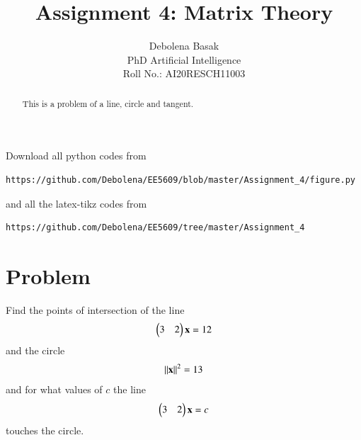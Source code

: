 \documentclass[journal,12pt,twocolumn]{IEEEtran}
\begin{document}
\makeatletter
{}
\makeatother
\let\StandardTheFigure\thefigure
\let\vec\mathbf
\renewcommand{\thefigure}{\theproblem}
\def\putbox#1#2#3{\makebox[0in][l]{\makebox[#1][l]{}\raisebox{\baselineskip}[0in][0in]{\raisebox{#2}[0in][0in]{#3}}}}
     \def\rightbox#1{\makebox[0in][r]{#1}}
     \def\centbox#1{\makebox[0in]{#1}}
     \def\topbox#1{\raisebox{-\baselineskip}[0in][0in]{#1}}
     \def\midbox#1{\raisebox{-0.5\baselineskip}[0in][0in]{#1}}
\vspace{3cm}
\title{Assignment 4: Matrix Theory}
\author{Debolena Basak\\PhD Artificial Intelligence\\ Roll No.: AI20RESCH11003}

\maketitle
\newpage
\bigskip
\renewcommand{\thefigure}{\theenumi}
\renewcommand{\thetable}{\theenumi}

\begin{abstract}
This is a problem of a line, circle and tangent.
\end{abstract}

Download all python codes from 

\begin{lstlisting}
https://github.com/Debolena/EE5609/blob/master/Assignment_4/figure.py
\end{lstlisting}
%
and all the latex-tikz codes from 
%
\begin{lstlisting}
https://github.com/Debolena/EE5609/tree/master/Assignment_4
\end{lstlisting}
%
\section{Problem}
Find the points of intersection of the line
\begin{align}
    \label{eq1}\myvec{3 & 2}\vec x = 12
\end{align}
and the circle
\begin{align}
    \label{eq:circle} \norm{\vec{x}}^2 = 13
\end{align}
and for what values of $c$ the line
\begin{align}
    \label{tangent}\myvec{3 &2}\vec x = c 
\end{align}
touches the circle.
%
\end{document}
